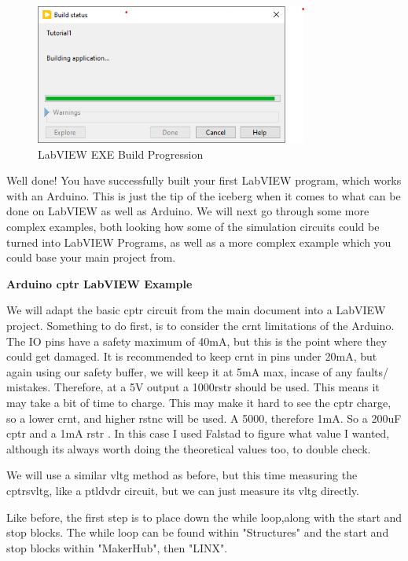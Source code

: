 \documentclass[a4paper,11pt]{report}
\begin{document}
\begin{figure}[H]
\centering
\includegraphics[width=0.8\textwidth]{screenshots/labview44}
\caption{LabVIEW EXE Build Progression}
\end{figure}

Well done! You have successfully built your first LabVIEW program, which works with an Arduino. This is just the tip of the iceberg when it comes to what can be done on LabVIEW as well as Arduino. We will next go through some more complex examples, both looking how some of the simulation circuits could be turned into LabVIEW Programs, as well as a more complex example which you could base your main project from.

\textbf{Arduino \gls{cptr} LabVIEW Example}

We will adapt the basic \gls{cptr} circuit from the main document into a LabVIEW project. Something to do first, is to consider the \gls{crnt} limitations of the Arduino. The IO pins have a safety maximum of 40mA, but this is the point where they could get damaged. It is recommended to keep \gls{crnt} in pins under 20mA, but again using our safety buffer, we will keep it at 5mA max, incase of any faults/ mistakes. Therefore, at a 5V output a 1000\ohm \gls{rstr} should be used. This means it may take a bit of time to charge. This may make it hard to see the \gls{cptr} charge, so a lower \gls{crnt}, and higher \gls{rstnc} will be used. A 5000\ohm, therefore 1mA. So a 200uF \gls{cptr} and a 1mA \gls{rstr} . In this case I used Falstad to figure what value I wanted, although its always worth doing the theoretical values too, to double check.

We will use a similar \gls{vltg} method as before, but this time measuring the \gls{cptr}s\gls{vltg}, like a \gls{ptldvdr} circuit, but we can just measure its \gls{vltg} directly.

Like before, the first step is to place down the while loop,along with the start and stop blocks. The while loop can be found within "Structures" and the start and stop blocks within "MakerHub", then "LINX".
\end{document}
